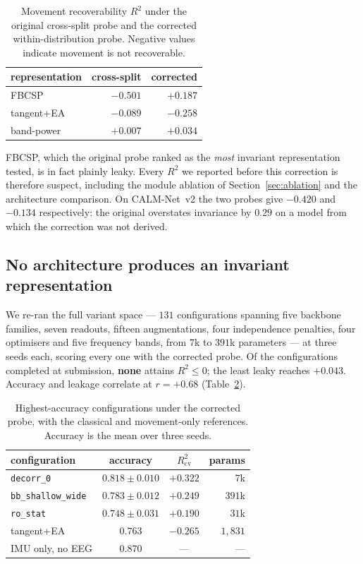 \documentclass[conference]{IEEEtran}
\begin{document}
\begin{table}[t]
\caption{Movement recoverability $R^2$ under the original cross-split probe and
the corrected within-distribution probe. Negative values indicate movement is not
recoverable.}
\label{tab:probe}
\centering
\begin{tabular}{lrr}
\toprule
representation & cross-split & corrected \\
\midrule
FBCSP      & $-0.501$ & $+0.187$ \\
tangent+EA & $-0.089$ & $-0.258$ \\
band-power & $+0.007$ & $+0.034$ \\
\bottomrule
\end{tabular}
\end{table}

FBCSP, which the original probe ranked as the \emph{most} invariant representation
tested, is in fact plainly leaky. Every $R^2$ we reported before this correction is
therefore suspect, including the module ablation of Section~\ref{sec:ablation} and the
architecture comparison. On CALM-Net~v2 the two probes give $-0.420$ and $-0.134$
respectively: the original overstates invariance by $0.29$ on a model from which the
correction was not derived.

\subsection{No architecture produces an invariant representation}

We re-ran the full variant space --- $131$ configurations spanning five backbone
families, seven readouts, fifteen augmentations, four independence penalties, four
optimisers and five frequency bands, from $7$k to $391$k parameters --- at three seeds
each, scoring every one with the corrected probe. Of the configurations completed at
submission, \textbf{none} attains $R^2 \le 0$; the least leaky reaches $+0.043$.
Accuracy and leakage correlate at $r = +0.68$ (Table~\ref{tab:topcfg}).

\begin{table}[t]
\caption{Highest-accuracy configurations under the corrected probe, with the
classical and movement-only references. Accuracy is the mean over three seeds.}
\label{tab:topcfg}
\centering
\setlength{\tabcolsep}{4pt}
\begin{tabular}{lccr}
\toprule
configuration & accuracy & $R^2_{\mathrm{cv}}$ & params \\
\midrule
\texttt{decorr\_0}         & $0.818 \pm 0.010$ & $+0.322$ & $7$k \\
\texttt{bb\_shallow\_wide} & $0.783 \pm 0.012$ & $+0.249$ & $391$k \\
\texttt{ro\_stat}          & $0.748 \pm 0.031$ & $+0.190$ & $31$k \\
\midrule
tangent+EA                 & $0.763$           & $-0.265$ & $1{,}831$ \\
IMU only, no EEG           & $0.870$           & ---      & --- \\
\bottomrule
\end{tabular}
\end{table}
\end{document}

